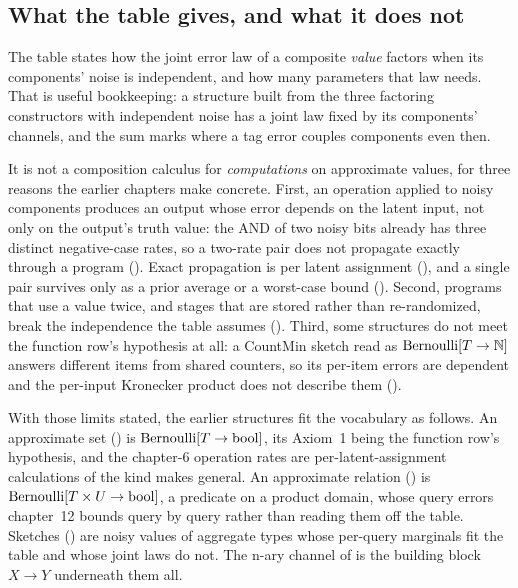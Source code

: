 \subsection*{What the table gives, and what it does not}

The table states how the joint error law of a composite \emph{value} factors when
its components' noise is independent, and how many parameters that law needs.
That is useful bookkeeping: a structure built from the three factoring
constructors with independent noise has a joint law fixed by its components'
channels, and the sum marks where a tag error couples components even then.

It is not a composition calculus for \emph{computations} on approximate values,
for three reasons the earlier chapters make concrete. First, an operation applied
to noisy components produces an output whose error depends on the latent input,
not only on the output's truth value: the AND of two noisy bits already has three
distinct negative-case rates, so a two-rate pair does not propagate exactly
through a program (). Exact propagation is per
latent assignment (), and a single pair survives
only as a prior average or a worst-case
bound
(). Second, programs that use a value twice,
and stages that are stored rather than re-randomized, break the independence the
table assumes (). Third, some structures do not meet
the function row's hypothesis at all: a CountMin sketch read as $\mathrm{Bernoulli}[T \to
\mathbb{N}]$ answers different items from shared counters, so its per-item errors
are dependent and the per-input Kronecker product does not describe them
().

With those limits stated, the earlier structures fit the vocabulary as follows.
An approximate set () is $\mathrm{Bernoulli}[T \to \mathrm{bool}]$,
its Axiom~1 being the function row's hypothesis, and the chapter-6 operation
rates are per-latent-assignment calculations of the kind
 makes general. An approximate relation
() is $\mathrm{Bernoulli}[T \times U \to \mathrm{bool}]$, a
predicate on a product domain, whose query errors chapter~12 bounds query by
query rather than reading them off the table. Sketches
() are noisy values of aggregate types whose
per-query marginals fit the table and whose joint laws do not. The n-ary channel
of  is the building block $X \to Y$ underneath
them all.

